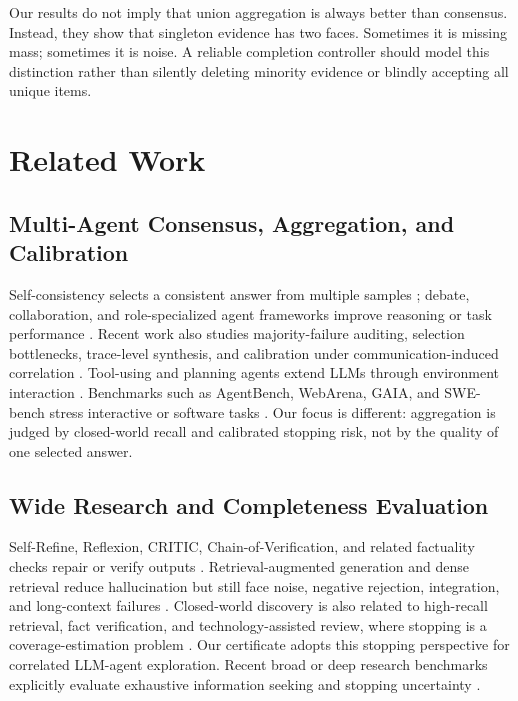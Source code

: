 \documentclass[letterpaper]{article}
\begin{document}
Our results do not imply that union aggregation is always better than consensus.
Instead, they show that singleton evidence has two faces. Sometimes it is
missing mass; sometimes it is noise. A reliable completion controller should
model this distinction rather than silently deleting minority evidence or
blindly accepting all unique items.

\section{Related Work}

\subsection{Multi-Agent Consensus, Aggregation, and Calibration}

Self-consistency selects a consistent answer from multiple samples
\citep{wang2022selfconsistency}; debate, collaboration, and role-specialized
agent frameworks improve reasoning or task performance
\citep{du2023debate,chan2023chateval,wu2023autogen,chen2023agentverse,
hong2023metagpt,li2023camel,zhang2024proagent}. Recent work also studies
majority-failure auditing, selection bottlenecks, trace-level synthesis, and
calibration under communication-induced correlation
\citep{yang2026agentauditor,maryanskyy2026agentsdisagree,
fadnavis2026beyondconsensus,huang2026cagecal}. Tool-using and
planning agents extend LLMs through environment interaction
\citep{yao2023react,schick2023toolformer,qin2023toolllm,yao2023tot,
wang2023voyager}. Benchmarks such as
AgentBench, WebArena, GAIA, and SWE-bench stress interactive or software tasks
\citep{liu2023agentbench,zhou2023webarena,mialon2023gaia,jimenez2023swebench}.
Our focus is different: aggregation is judged by closed-world recall and
calibrated stopping risk, not by the quality of one selected answer.

\subsection{Wide Research and Completeness Evaluation}

Self-Refine, Reflexion, CRITIC, Chain-of-Verification, and related factuality
checks repair or verify outputs
\citep{madaan2023selfrefine,shinn2023reflexion,gou2023critic,dhuliawala2023cov,
lin2021truthfulqa,manakul2023selfcheckgpt,li2023halueval}. Retrieval-augmented
generation and dense retrieval reduce hallucination but still face noise,
negative rejection, integration, and long-context failures
\citep{lewis2020rag,guu2020realm,karpukhin2020dpr,nakano2021webgpt,
chen2024rgb,li2024unigen,liu2023lost,asai2023selfrag,
gao2023ragsurvey}. Closed-world discovery is also related to high-recall
retrieval, fact verification, and technology-assisted review, where stopping is
a coverage-estimation problem
\citep{thorne2018fever,yang2018hotpotqa,grossman2015trec,
cormack2021tarstopping}. Our certificate adopts this stopping perspective for
correlated LLM-agent exploration.
Recent broad or deep research benchmarks explicitly evaluate exhaustive
information seeking and stopping uncertainty
\citep{wong2025widesearch,gupta2026deepsearchqa,rafiee2026trqa,
huang2026wideseek,kim2026seekergym}.
\end{document}
